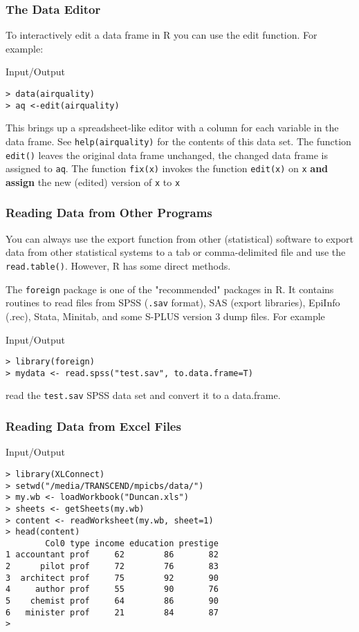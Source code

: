 \documentclass[xcolor={table},c]{beamer}
\begin{document}
\begin{frame}[fragile]\frametitle{The Data Editor}
To interactively edit a data frame in R you can use the edit function. For example:
\begin{exampleblock}{Input/Output}
\begin{verbatim}
> data(airquality)
> aq <-edit(airquality)
\end{verbatim}
\end{exampleblock}
This brings up a spreadsheet-like editor with a column for each variable in the data frame.
 See \texttt{help(airquality)}  for the contents of this data set.
The function \texttt{edit()} leaves the original data frame unchanged, the changed data frame is assigned to \texttt{aq}. The function \texttt{fix(x)} invokes the function \texttt{edit(x)} on \texttt{x} \textbf{and assign} the new (edited) version of \texttt{x} to \texttt{x}  
\end{frame}


\begin{frame}[fragile]\frametitle{Reading Data from Other Programs}
You can always use the export function from other (statistical) software to export data from other statistical systems to a tab or comma-delimited file and use the \texttt{read.table()}. However, R has some direct methods. 

The \texttt{foreign} package is one of the "recommended" packages in R. It contains routines to read files from SPSS (\texttt{.sav} format), SAS (export libraries), EpiInfo (.rec), Stata, Minitab, and some S-PLUS version 3 dump files. For example
\begin{exampleblock}{Input/Output}
\begin{verbatim}
> library(foreign)
> mydata <- read.spss("test.sav", to.data.frame=T)
\end{verbatim}
\end{exampleblock}
read the \texttt{test.sav} SPSS data set and convert it to a data.frame.
\end{frame}

\begin{frame}[fragile]\frametitle{Reading Data from Excel Files}
\begin{exampleblock}{Input/Output}
\small
\begin{verbatim}
> library(XLConnect)
> setwd("/media/TRANSCEND/mpicbs/data/")
> my.wb <- loadWorkbook("Duncan.xls")
> sheets <- getSheets(my.wb)
> content <- readWorksheet(my.wb, sheet=1)
> head(content)
        Col0 type income education prestige
1 accountant prof     62        86       82
2      pilot prof     72        76       83
3  architect prof     75        92       90
4     author prof     55        90       76
5    chemist prof     64        86       90
6   minister prof     21        84       87
> 
\end{verbatim}
\end{exampleblock}
\end{frame}
\end{document}
